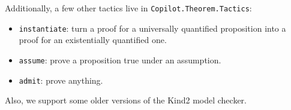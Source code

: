 Additionally, a few other tactics live in {\tt Copilot.Theorem.Tactics}:
\begin{itemize}
\item {\tt instantiate}: turn a proof for a universally quantified proposition
into a proof for an existentially quantified one.
\item {\tt assume}: prove a proposition true under an assumption.
\item {\tt admit}: prove anything.
\end{itemize}

Also, we support some older versions of the Kind2 model checker.
